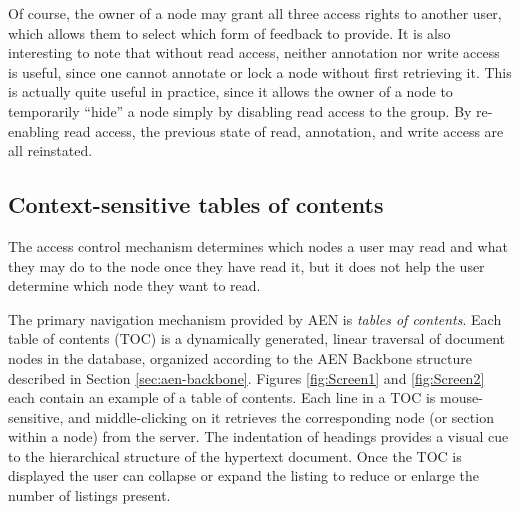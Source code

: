 Of course, the owner of a node may grant all three access rights to another
user, which allows them to select which form of feedback to provide.  It is
also interesting to note that without read access, neither annotation nor
write access is useful, since one cannot annotate or lock a node without
first retrieving it.  This is actually quite useful in practice, since it
allows the owner of a node to temporarily ``hide'' a node simply by
disabling read access to the group.  By re-enabling read access, the
previous state of read, annotation, and write access are all reinstated.


\begin{figure*}[htb]
 \centerline{}
 \caption{ This screen shot illustrates some of the real-time support
for strong collaboration in AEN.  The Snoopy window in the lower right hand
corner shows, for each user of the system, whether or not they are logged
in currently and if so, where they are working in the document.  Both user
cmoore and user jeremyt are working on the document node called ``Shared
Emacs''.  The Partyline screen, in the lower left hand corner, allows these
users (as well as all others) to talk to each other while they work.  This
figure also shows a local TOC for the Shared Emacs chapter, and a screen
displaying the current set of unread document nodes for this user.}
 \label{fig:Screen2}
\end{figure*}

\subsection{Context-sensitive tables of contents}

The access control mechanism determines which nodes a user may read and
what they may do to the node once they have read it, but it
does not help the user determine which node they want to read. 

The primary navigation mechanism provided by AEN is {\em tables of
contents}. Each table of contents (TOC) is a dynamically generated, linear
traversal of document nodes in the database, organized according to the AEN
Backbone structure described in Section \ref{sec:aen-backbone}.  Figures
\ref{fig:Screen1} and \ref{fig:Screen2} each contain an example of a table
of contents. Each line in a TOC is mouse-sensitive,
and middle-clicking on it retrieves the corresponding node (or section
within a node) from the server. The indentation of headings provides a
visual cue to the hierarchical structure of the hypertext document.  Once the TOC is
displayed the user can collapse or expand the listing to reduce or enlarge
the number of listings present.

